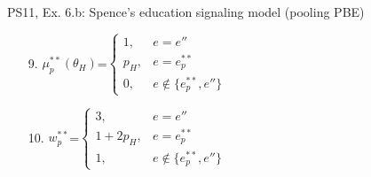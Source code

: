 \begin{frame}{PS11, Ex. 6.b: Spence’s education signaling model (pooling PBE)}
\begin{multicols}{2}
\begin{enumerate}
\begin{itemize}
        \end{itemize}
        \item[9.] $\mu_p^{**}(\theta_H)$=$\left\{\begin{array}{rl}
                      1, & e = e'' \\
                      p_H, & e = e_p^{**} \\
                      0, & e \notin \{e_p^{**},e''\}
                    \end{array}\right.$
        \item[10.] $w_p^{**}$=$\left\{\begin{array}{rl}
                      3, & e = e'' \\
                      1+2p_H, & e = e_p^{**} \\
                      1, & e \notin \{e_p^{**},e''\}
                    \end{array}\right.$
      \end{enumerate}
      \vfill\null
    \end{multicols}
\end{frame}

